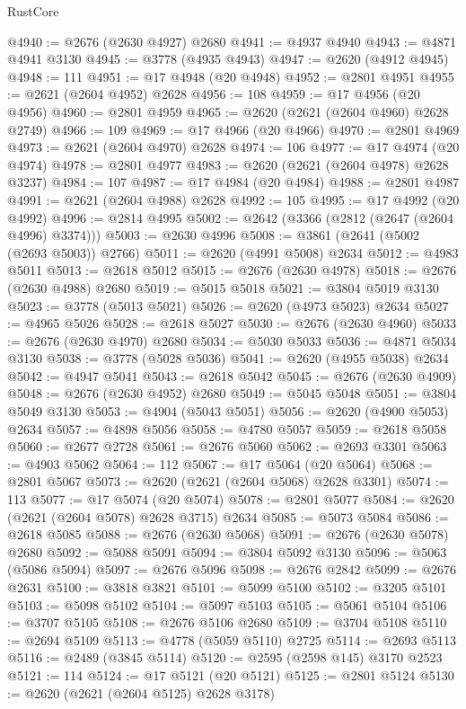 \begin{lexlean}{RustCore}
\begin{coremodule}
@4940 := @2676 (@2630 @4927) @2680
@4941 := @4937 @4940
@4943 := @4871 @4941 @3130
@4945 := @3778 (@4935 @4943)
@4947 := @2620 (@4912 @4945)
@4948 := 111
@4951 := @17 @4948 (@20 @4948)
@4952 := @2801 @4951
@4955 := @2621 (@2604 @4952) @2628
@4956 := 108
@4959 := @17 @4956 (@20 @4956)
@4960 := @2801 @4959
@4965 := @2620 (@2621 (@2604 @4960) @2628 @2749)
@4966 := 109
@4969 := @17 @4966 (@20 @4966)
@4970 := @2801 @4969
@4973 := @2621 (@2604 @4970) @2628
@4974 := 106
@4977 := @17 @4974 (@20 @4974)
@4978 := @2801 @4977
@4983 := @2620 (@2621 (@2604 @4978) @2628 @3237)
@4984 := 107
@4987 := @17 @4984 (@20 @4984)
@4988 := @2801 @4987
@4991 := @2621 (@2604 @4988) @2628
@4992 := 105
@4995 := @17 @4992 (@20 @4992)
@4996 := @2814 @4995
@5002 := @2642 (@3366 (@2812 (@2647 (@2604 @4996) @3374)))
@5003 := @2630 @4996
@5008 := @3861 (@2641 (@5002 (@2693 @5003)) @2766)
@5011 := @2620 (@4991 @5008) @2634
@5012 := @4983 @5011
@5013 := @2618 @5012
@5015 := @2676 (@2630 @4978)
@5018 := @2676 (@2630 @4988) @2680
@5019 := @5015 @5018
@5021 := @3804 @5019 @3130
@5023 := @3778 (@5013 @5021)
@5026 := @2620 (@4973 @5023) @2634
@5027 := @4965 @5026
@5028 := @2618 @5027
@5030 := @2676 (@2630 @4960)
@5033 := @2676 (@2630 @4970) @2680
@5034 := @5030 @5033
@5036 := @4871 @5034 @3130
@5038 := @3778 (@5028 @5036)
@5041 := @2620 (@4955 @5038) @2634
@5042 := @4947 @5041
@5043 := @2618 @5042
@5045 := @2676 (@2630 @4909)
@5048 := @2676 (@2630 @4952) @2680
@5049 := @5045 @5048
@5051 := @3804 @5049 @3130
@5053 := @4904 (@5043 @5051)
@5056 := @2620 (@4900 @5053) @2634
@5057 := @4898 @5056
@5058 := @4780 @5057
@5059 := @2618 @5058
@5060 := @2677 @2728
@5061 := @2676 @5060
@5062 := @2693 @3301
@5063 := @4903 @5062
@5064 := 112
@5067 := @17 @5064 (@20 @5064)
@5068 := @2801 @5067
@5073 := @2620 (@2621 (@2604 @5068) @2628 @3301)
@5074 := 113
@5077 := @17 @5074 (@20 @5074)
@5078 := @2801 @5077
@5084 := @2620 (@2621 (@2604 @5078) @2628 @3715) @2634
@5085 := @5073 @5084
@5086 := @2618 @5085
@5088 := @2676 (@2630 @5068)
@5091 := @2676 (@2630 @5078) @2680
@5092 := @5088 @5091
@5094 := @3804 @5092 @3130
@5096 := @5063 (@5086 @5094)
@5097 := @2676 @5096
@5098 := @2676 @2842
@5099 := @2676 @2631
@5100 := @3818 @3821
@5101 := @5099 @5100
@5102 := @3205 @5101
@5103 := @5098 @5102
@5104 := @5097 @5103
@5105 := @5061 @5104
@5106 := @3707 @5105
@5108 := @2676 @5106 @2680
@5109 := @3704 @5108
@5110 := @2694 @5109
@5113 := @4778 (@5059 @5110) @2725
@5114 := @2693 @5113
@5116 := @2489 (@3845 @5114)
@5120 := @2595 (@2598 @145) @3170 @2523
@5121 := 114
@5124 := @17 @5121 (@20 @5121)
@5125 := @2801 @5124
@5130 := @2620 (@2621 (@2604 @5125) @2628 @3178)

\end{coremodule}
\end{lexlean}
